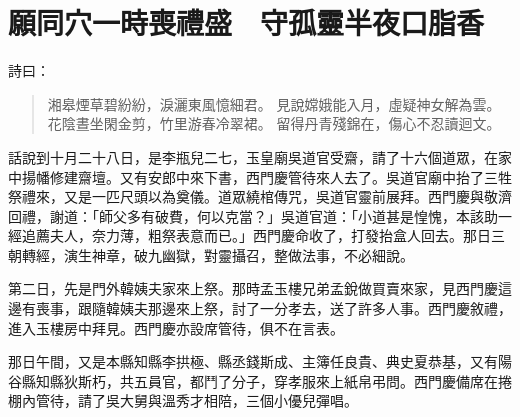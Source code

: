 
\chapter{願同穴一時喪禮盛　守孤靈半夜口脂香}

詩曰：
\begin{quote}
湘皋煙草碧紛紛，淚灑東風憶細君。
見說嫦娥能入月，虛疑神女解為雲。
花陰晝坐閑金剪，竹里游春冷翠裙。
留得丹青殘錦在，傷心不忍讀迴文。
\end{quote}

話說到十月二十八日，是李瓶兒二七，玉皇廟吳道官受齋，請了十六個道眾，在家中揚幡修建齋壇。又有安郎中來下書，西門慶管待來人去了。吳道官廟中抬了三牲祭禮來，又是一匹尺頭以為奠儀。道眾繞棺傳咒，吳道官靈前展拜。西門慶與敬濟回禮，謝道：「師父多有破費，何以克當？」吳道官道：「小道甚是惶愧，本該助一經追薦夫人，奈力薄，粗祭表意而已。」西門慶命收了，打發抬盒人回去。那日三朝轉經，演生神章，破九幽獄，對靈攝召，整做法事，不必細說。

第二日，先是門外韓姨夫家來上祭。那時孟玉樓兄弟孟銳做買賣來家，見西門慶這邊有喪事，跟隨韓姨夫那邊來上祭，討了一分孝去，送了許多人事。西門慶敘禮，進入玉樓房中拜見。西門慶亦設席管待，俱不在言表。

那日午間，又是本縣知縣李拱極、縣丞錢斯成、主簿任良貴、典史夏恭基，又有陽谷縣知縣狄斯朽，共五員官，都鬥了分子，穿孝服來上紙帛弔問。西門慶備席在捲棚內管待，請了吳大舅與溫秀才相陪，三個小優兒彈唱。

